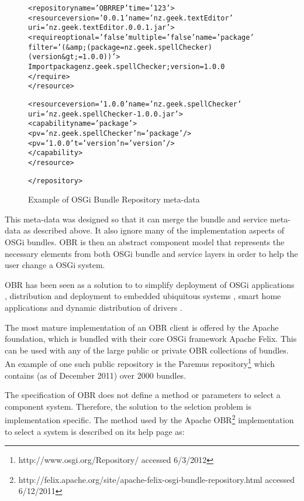 \begin{figure}[htp]
\begin{center}
\begin{alltt}
<repository name='OBR REP' time='123'> 
 <resource version='0.0.1' name='nz.geek.textEditor' 
 uri='nz.geek.textEditor.0.0.1.jar'> 
  <require optional='false'  multiple='false'  name='package' 
    filter='(&amp;(package=nz.geek.spellChecker)(version&gt;=1.0.0))'> 
   Import package nz.geek.spellChecker ;version=1.0.0 
  </require> 
 </resource> 

 <resource version='1.0.0' name='nz.geek.spellChecker' 
 uri='nz.geek.spellChecker-1.0.0.jar'> 
  <capability name='package'> 
    <p v='nz.geek.spellChecker' n='package'/> 
    <p v='1.0.0' t='version' n='version'/> 
  </capability> 
 </resource> 

</repository>
\end{alltt}
  \caption[OSGi Bundle Repository markup example]{Example of OSGi Bundle Repository meta-data}
  \label{obrmetadata}
\end{center}
\end{figure}

This meta-data was designed so that it can merge the bundle and service meta-data as described above.
It also ignore many of the implementation aspects of OSGi bundles.
OBR is then an abstract component model that represents the necessary elements from both OSGi bundle and service layers in order to help the user change a OSGi system. 

OBR has been seen as a solution to to simplify deployment of OSGi applications \citep{Jung2007}, 
distribution and deployment to embedded ubiquitous systems \citep{Jung2006}, 
smart home applications \citep{Gouin-Vallerand2007} and 
dynamic distribution of drivers \citep{Kriens2008}. 

The most mature implementation of an OBR client is offered by the Apache foundation, which is bundled with their core OSGi framework Apache Felix. 
This can be used with any of the large public or private OBR collections of bundles.
An example of one such public repository is the Paremus repository\footnote{http://www.osgi.org/Repository/ accessed 6/3/2012} which contains (as of December 2011) over 2000 bundles.

The specification of OBR does not define a method or parameters to select a component system.
Therefore, the solution to the selction problem is implementation specific.
The method used by the Apache OBR\footnote{http://felix.apache.org/site/apache-felix-osgi-bundle-repository.html accessed 6/12/2011} implementation 
to select a system is described on its help page as:

